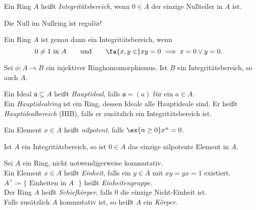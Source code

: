 \documentclass{cheat-sheet}
\newcommand{\aaa}{\mathfrak{a}}
\begin{document}
\begin{defn}
  Ein Ring $A$ heißt \emph{Integritätsbereich}, wenn $0 \in A$ der einzige Nullteiler in $A$ ist.
\end{defn}

\begin{acht}
  Die Null im Nullring ist regulär!
\end{acht}

\begin{bem}
  Ein Ring $A$ ist genau dann ein Integritätsbereich, wenn
  \[
    0 \neq 1 \text{ in $A$}
    \qquad \text{und} \qquad
    \fa{x, y \in } xy = 0 \implies x = 0 \vee y = 0.
  \]
\end{bem}

\begin{beob}
  Sei $\phi : A \to B$ ein injektiver Ringhomomorphismus.
  Ist $B$ ein Integritätsbereich, so auch $A$.
\end{beob}

\begin{defn}
  Ein Ideal $\aaa \subseteq A$ heißt \emph{Hauptideal}, falls $\aaa = (a)$ für ein $a \in A$. \\
  Ein \emph{Hauptidealring} ist ein Ring, dessen Ideale alle Hauptideale sind.
  Er heißt \emph{Hauptidealbereich} (HIB), falls er zusätzlich ein Integritätsbereich ist.
\end{defn}

\begin{bspe}
  \inlineitem{$\Z$,} \enspace
\end{bspe}

\begin{gegenbsp}
\end{gegenbsp}


\begin{defn}
  Ein Element $x \in A$ heißt \emph{nilpotent}, falls $\ex{n \geq 0} x^n = 0$.
\end{defn}

\begin{beob}
  Ist $A$ ein Integritätsbereich, so ist $0 \in A$ das einzige nilpotente Element in $A$.
\end{beob}


\begin{defn}
  Sei $A$ ein Ring, nicht notwendigerweise kommutativ. \\
  Ein Element $x \in A$ heißt \emph{Einheit}, falls ein $y \in A$ mit $xy = yx = 1$ existiert.
  $A^\times \coloneqq \{ \text{ Einheiten in $A$ } \}$ heißt \emph{Einheitengruppe}. \\
  Der Ring $A$ heißt \emph{Schiefkörper}, falls $0$ die einzige Nicht-Einheit ist. \\
  Falls zusätzlich $A$ kommutativ ist, so heißt $A$ ein \emph{Körper}.
\end{defn}
\end{document}
